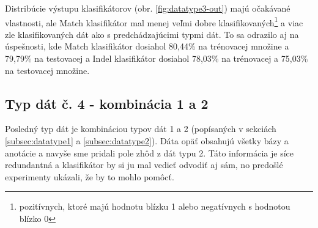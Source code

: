 Distribúcie výstupu klasifikátorov (obr. \ref{fig:datatype3-out}) majú očakávané vlastnosti, ale Match klasifikátor mal menej veľmi dobre klasifikovaných\footnote{pozitívnych, ktoré majú hodnotu blízku 1 alebo negatívnych s hodnotou blízko 0} a viac zle klasifikovaných dát ako s predchádzajúcimi typmi dát.
To sa odrazilo aj na úspešnosti, kde Match klasifikátor dosiahol 80,44\% na trénovacej množine a 79,79\% na testovacej a Indel klasifikátor dosiahol 78,03\% na trénovacej a 75,03\% na testovacej množine.

\subsection{Typ dát č. 4 - kombinácia 1 a 2}

Posledný typ dát je kombináciou typov dát 1 a 2 (popísaných v sekciách \ref{subsec:datatype1} a \ref{subsec:datatype2}). Dáta opäť obsahujú všetky bázy a anotácie a navyše sme pridali pole zhôd z dát typu 2. Táto informácia je síce redundantná a klasifikátor by si ju mal vedieť odvodiť aj sám, no predošlé experimenty ukázali, že by to mohlo pomôcť.

